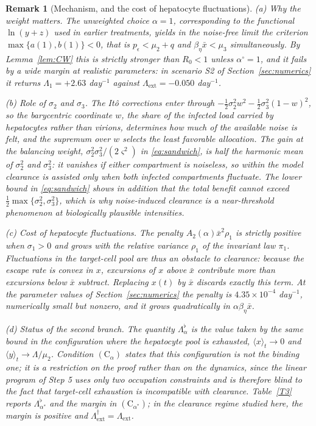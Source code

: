 \documentclass{article}
\newtheorem{remark}{Remark}[section]
\newcommand{\betaeta}{\beta_\eta}
\newcommand{\peps}{p_\epsilon}
\newcommand{\Rz}{R_0}
\newcommand{\Lext}{\Lambda_{\mathrm{ext}}}
\newcommand{\Lsharp}{\Lambda_{\mathrm{ext}}^{\dagger}}
\newcommand{\avg}[1]{\big\langle #1 \big\rangle_t}
\begin{document}
\begin{remark}[Mechanism, and the cost of hepatocyte fluctuations]\label{rem:extinction}
\emph{(a) Why the weight matters.} The unweighted choice $\alpha=1$, corresponding to the functional $\ln(y+z)$ used in earlier treatments, yields in the noise-free limit the criterion $\max\{a(1),b(1)\}<0$, that is $\peps<\mu_2+q$ and $\betaeta\bar x<\mu_3$ simultaneously. By Lemma~\ref{lem:CW} this is strictly stronger than $\Rz<1$ unless $\alpha^\circ=1$, and it fails by a wide margin at realistic parameters: in scenario S2 of Section~\ref{sec:numerics} it returns $\Lambda_1=+2.63$ day$^{-1}$ against $\Lext=-0.050$ day$^{-1}$.

\emph{(b) Role of $\sigma_2$ and $\sigma_3$.} The It\^o corrections enter through $-\tfrac12\sigma_2^2w^2-\tfrac12\sigma_3^2(1-w)^2$, so the barycentric coordinate $w$, the share of the infected load carried by hepatocytes rather than virions, determines how much of the available noise is felt, and the supremum over $w$ selects the least favorable allocation. The gain at the balancing weight, $\sigma_2^2\sigma_3^2/(2\varsigma^2)$ in \eqref{eq:sandwich}, is half the harmonic mean of $\sigma_2^2$ and $\sigma_3^2$: it vanishes if either compartment is noiseless, so within the model clearance is assisted only when both infected compartments fluctuate. The lower bound in \eqref{eq:sandwich} shows in addition that the total benefit cannot exceed $\tfrac12\max\{\sigma_2^2,\sigma_3^2\}$, which is why noise-induced clearance is a near-threshold phenomenon at biologically plausible intensities.

\emph{(c) Cost of hepatocyte fluctuations.} The penalty $A_2(\alpha)\bar x^2\rho_1$ is strictly positive when $\sigma_1>0$ and grows with the relative variance $\rho_1$ of the invariant law $\pi_1$. Fluctuations in the target-cell pool are thus an obstacle to clearance: because the escape rate is convex in $x$, excursions of $x$ above $\bar x$ contribute more than excursions below $\bar x$ subtract. Replacing $x(t)$ by $\bar x$ discards exactly this term. At the parameter values of Section~\ref{sec:numerics} the penalty is $4.35\times10^{-4}$ day$^{-1}$, numerically small but nonzero, and it grows quadratically in $\alpha\betaeta\bar x$.

\emph{(d) Status of the second branch.} The quantity $\Lambda_\alpha^{\flat}$ is the value taken by the same bound in the configuration where the hepatocyte pool is exhausted, $\avg{x}\to0$ and $\avg{y}\to\Lambda/\mu_2$. Condition $(\mathrm{C}_\alpha)$ states that this configuration is not the binding one; it is a restriction on the proof rather than on the dynamics, since the linear  program of Step 5 uses only two occupation constraints and is therefore blind to the fact that target-cell exhaustion is incompatible with clearance. Table~\ref{T3} reports $\Lambda_{\alpha^\ast}^\flat$ and the margin in $(\mathrm{C}_{\alpha^\ast})$; in the clearance regime studied here, the margin is positive and $\Lsharp=\Lext$.
\end{remark}
\end{document}
